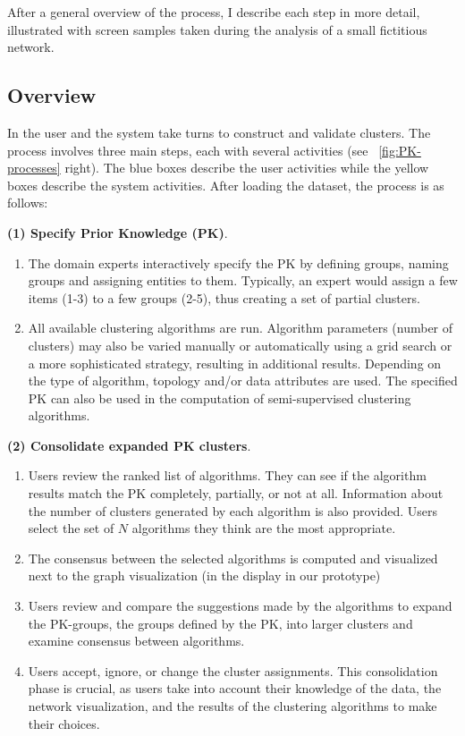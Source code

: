 After a general overview of the process, I describe each step in more detail, illustrated with screen samples taken during the analysis of a small fictitious network.

\subsection{Overview}
\label{sec:pk-clustering}

In \pkclustering the user and the system take turns to construct and validate clusters.
The process involves three main steps, each with several activities (see ~\autoref{fig:PK-processes} right).
The blue boxes describe the user activities while the yellow boxes describe the system activities.
After loading the dataset, the process is as follows:

\noindent \textbf{(1) Specify Prior Knowledge (PK)}.
\begin{enumerate}[left=.3em,nosep,label={\arabic*}.]
\item The domain experts interactively specify the PK by defining  groups, \ie naming groups and assigning entities to them.
Typically, an expert would assign a few items (1-3) to a few groups (2-5), thus creating a set of partial clusters.
\item All available clustering algorithms are run. Algorithm parameters (\eg number of clusters) may also be varied manually or automatically using a grid search or a more sophisticated strategy, resulting in additional results. Depending on the type of algorithm, topology and/or data attributes are used. The specified PK can also be used in the computation of semi-supervised clustering algorithms.
\end{enumerate}

\noindent \textbf{(2) Consolidate expanded PK clusters}.
\begin{enumerate}[left=.3em,nosep,label={\arabic*}.,start=3]
\item Users review the ranked list of algorithms. They can see if the algorithm results match the PK completely, partially, or not at all. Information about the number of clusters generated by each algorithm is also provided.  Users select the set of $N$ algorithms they think are the most appropriate.
\item The consensus between the selected algorithms is computed and visualized next to the graph visualization  (in the \paovis display in our prototype)
\item Users review and compare the suggestions made by the algorithms to expand the PK-groups, \ie the groups defined by the PK, into larger clusters and examine consensus between algorithms.
\item Users accept, ignore, or change the cluster assignments. This consolidation phase is crucial, as users take into account their knowledge of the data, the network visualization, and the results of the clustering algorithms to make their choices.
\end{enumerate}

